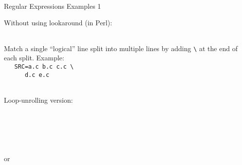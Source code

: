 \documentclass[10pt, a4paper, landscape]{scrartcl}
\newcommand{\regex}[1]{\texttt{#1}}
\newcommand{\cregex}[1]{\colorbox{gray!30}{\regex{#1}}}
\newcommand{\bs}{\textbackslash}
\newcommand{\reshortexample}[1]{\cregex{}}
\newcommand{\relongexample}[1]{\regex{}}
\begin{document}
\begin{cheatsheet}{Regular Expressions Examples 1}
\begin{col2}
Without using lookaround (in Perl):\\
\relongexample{./thousandsep_2.tex}\\


Match a single ``logical'' line split into multiple lines by adding \cregex{\bs}
at the end of each split. Example:\\
\texttt{%
\mbox{}\ \ SRC=a.c b.c c.c \bs\\
\mbox{}\ \ \ \ \ \ d.c e.c}

\reshortexample{./cont_line.tex}\\
Loop-unrolling version:\\
\relongexample{./cont_line_lu.tex}

\end{col2}

\begin{col3}


\relongexample{./date.tex}\\


\reshortexample{./time12.tex}\\


\reshortexample{./time24_1.tex}\\
or\\
\reshortexample{./time24_2.tex}\\

\end{col3}

\end{cheatsheet}

\newpage
\end{document}
